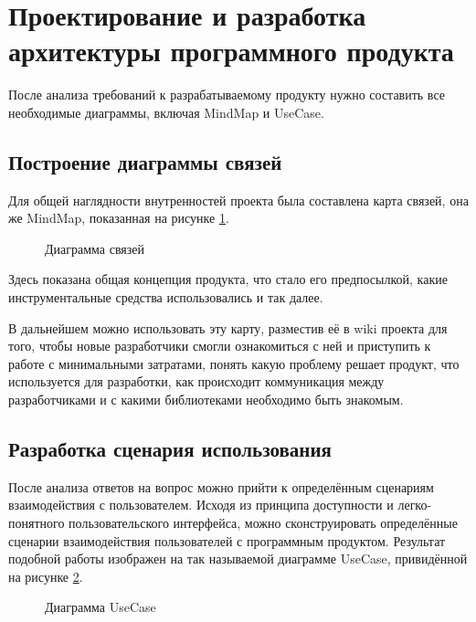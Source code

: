 \section{Проектирование и разработка архитектуры программного продукта}

После анализа требований к разрабатываемому продукту нужно составить все необходимые диаграммы, включая MindMap и UseCase.

\subsection{Построение диаграммы связей}

Для общей наглядности внутренностей проекта была составлена карта связей, она же MindMap, показанная на
рисунке \ref{des:mind_map}.

\begin{figure}[H]
    \caption{Диаграмма связей}
    \label{des:mind_map}
\end{figure}

Здесь показана общая концепция продукта, что стало его предпосылкой, какие инструментальные средства использовались
и так далее.

В дальнейшем можно использовать эту карту, разместив её в wiki проекта для того, чтобы новые разработчики смогли ознакомиться с ней
и приступить к работе с минимальными затратами, понять какую проблему решает продукт, что используется для разработки, как происходит
коммуникация между разработчиками и с какими библиотеками необходимо быть знакомым.

\subsection{Разработка сценария использования}

После анализа ответов на вопрос можно прийти к определённым сценариям взаимодействия с пользователем. Исходя из принципа доступности и легко-понятного
пользовательского интерфейса, можно сконструировать определённые сценарии взаимодействия пользователей с программным продуктом. Результат подобной работы
изображен на так называемой диаграмме UseCase, привидённой на рисунке \ref{des:use_case}.

\begin{figure}[H]
    \caption{Диаграмма UseCase}
    \label{des:use_case}
\end{figure}

